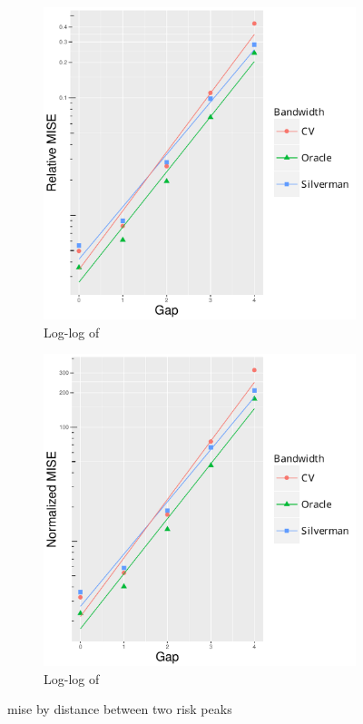 \begin{figure}[htbp]
    \begin{subfigure}[b]{0.24\textwidth}
        \includegraphics[width=\textwidth]{results/by_pop_risk_distance/RMISE-vs-population-risk-gap-log-log}
        \caption{Log-log of }
        \label{fig:ise:p1.4_100_Gap_risk:rmise_log_log}
    \end{subfigure}
    \begin{subfigure}[b]{0.24\textwidth}
        \includegraphics[width=\textwidth]{results/by_pop_risk_distance/NMISE-vs-population-risk-gap-log-log}
        \caption{Log-log of }
        \label{fig:ise:p1.4_100_Gap_risk:nmise_log_log}
    \end{subfigure}    
    \caption{\gls{mise} by distance between two risk peaks}
    \label{fig:ise:p1.4_100_Gap_risk}
\end{figure}

